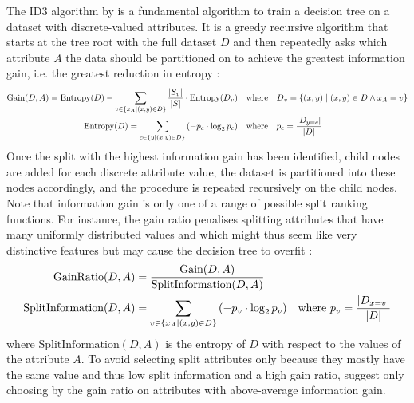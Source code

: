 The ID3 algorithm by \textcite{decision-trees-1986} is a fundamental algorithm to train a decision tree on a dataset with discrete-valued attributes. It is a greedy recursive algorithm that starts at the tree root with the full dataset $D$ and then repeatedly asks which attribute $A$ the data should be partitioned on to achieve the greatest information gain, i.e. the greatest reduction in entropy \cite{decision-trees-1986, machine-learning-1997}:
\begin{equation*}
    \begin{split}
        \text{Gain}(D, A) = \text{Entropy}(D) - \sum_{v \in \{ x_A \mathrel{|} (x, y) \in D \}}{\frac{|S_v|}{|S|} \cdot \text{Entropy}(D_v)} \quad &\text{where} \quad D_v = \{ (x, y) \mathrel{|} (x, y) \in D \land x_A = v \} \\
        \text{Entropy}(D) = \sum_{c \in \{ y \mathrel{|} (x, y) \in D \}}{\left( -p_c \cdot \log_{2}{p_c} \right)} \quad &\text{where} \quad p_c = \frac{|D_{y = c}|}{|D|}
    \end{split}
\end{equation*}
Once the split with the highest information gain has been identified, child nodes are added for each discrete attribute value, the dataset is partitioned into these nodes accordingly, and the procedure is repeated recursively on the child nodes. Note that information gain is only one of a range of possible split ranking functions. For instance, the gain ratio penalises splitting attributes that have many uniformly distributed values and which might thus seem like very distinctive features but may cause the decision tree to overfit \cite{decision-trees-1986, machine-learning-1997}:
\begin{equation*}
    \begin{split}
        \text{GainRatio}(D, A) &= \frac{\text{Gain}(D, A)}{\text{SplitInformation}(D, A)} \\
        \text{SplitInformation}(D, A) &= \sum_{v \in \{ x_A \mathrel{|} (x, y) \in D \}}{\left( -p_v \cdot \log_{2}{p_v} \right)} \quad \text{where } p_v = \frac{|D_{x = v}|}{|D|}
    \end{split}
\end{equation*}
where $\text{SplitInformation}(D, A)$ is the entropy of $D$ with respect to the values of the attribute $A$. To avoid selecting split attributes only because they mostly have the same value and thus low split information and a high gain ratio, \textcite{decision-trees-1986} suggest only choosing by the gain ratio on attributes with above-average information gain.

